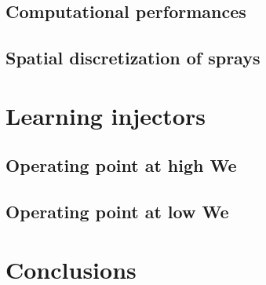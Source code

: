 \subsection{Computational performances}
\label{subsubsec:ch5_computational_performances}


\subsection{Spatial discretization of sprays}

\section{Learning injectors}

\subsection{Operating point at high We}

\subsection{Operating point at low We}


\section{Conclusions}

